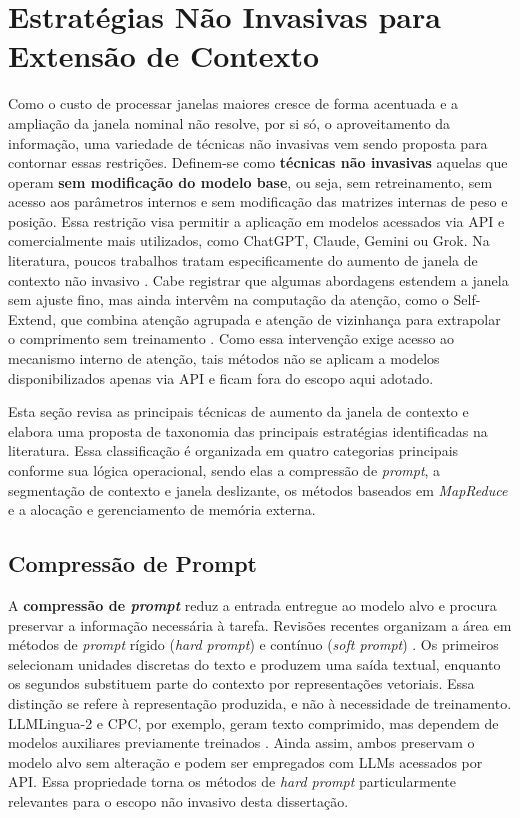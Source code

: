 \section{Estratégias Não Invasivas para Extensão de Contexto}
\label{sec:tecnicas-nao-invasivas}

Como o custo de processar janelas maiores cresce de forma acentuada e a ampliação da janela nominal não resolve, por si só, o aproveitamento da informação, uma variedade de técnicas não invasivas vem sendo proposta para contornar essas restrições. Definem-se como \textbf{técnicas não invasivas} aquelas que operam \textbf{sem modificação do modelo base}, ou seja, sem retreinamento, sem acesso aos parâmetros internos e sem modificação das matrizes internas de peso e posição. Essa restrição visa permitir a aplicação em modelos acessados via API e comercialmente mais utilizados, como ChatGPT, Claude, Gemini ou Grok. Na literatura, poucos trabalhos tratam especificamente do aumento de janela de contexto não invasivo \cite{huang2024longcontext,wang2024beyondlimits}. Cabe registrar que algumas abordagens estendem a janela sem ajuste fino, mas ainda intervêm na computação da atenção, como o Self-Extend, que combina atenção agrupada e atenção de vizinhança para extrapolar o comprimento sem treinamento \cite{jin2024selfextend}. Como essa intervenção exige acesso ao mecanismo interno de atenção, tais métodos não se aplicam a modelos disponibilizados apenas via API e ficam fora do escopo aqui adotado.

Esta seção revisa as principais técnicas de aumento da janela de contexto e elabora uma proposta de taxonomia das principais estratégias identificadas na literatura. Essa classificação é organizada em quatro categorias principais conforme sua lógica operacional, sendo elas a compressão de \textit{prompt}, a segmentação de contexto e janela deslizante, os métodos baseados em \textit{MapReduce} e a alocação e gerenciamento de memória externa.

\subsection{Compressão de Prompt}
\label{subsec:compressao-prompt}

A \textbf{compressão de \textit{prompt}} reduz a entrada entregue ao modelo alvo e procura preservar a informação necessária à tarefa. Revisões recentes organizam a área em métodos de \textit{prompt} rígido (\textit{hard prompt}) e contínuo (\textit{soft prompt}) \cite{li2025survey,jha2024characterizing}. Os primeiros selecionam unidades discretas do texto e produzem uma saída textual, enquanto os segundos substituem parte do contexto por representações vetoriais. Essa distinção se refere à representação produzida, e não à necessidade de treinamento. LLMLingua-2 e CPC, por exemplo, geram texto comprimido, mas dependem de modelos auxiliares previamente treinados \cite{pan2024llmlingua2,li2024cpc}. Ainda assim, ambos preservam o modelo alvo sem alteração e podem ser empregados com LLMs acessados por API. Essa propriedade torna os métodos de \textit{hard prompt} particularmente relevantes para o escopo não invasivo desta dissertação.

